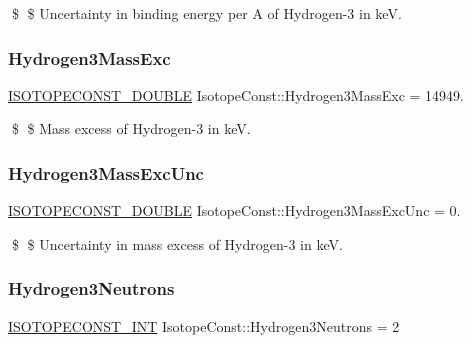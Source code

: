 \$ \$ Uncertainty in binding energy per A of Hydrogen-\/3 in keV. \mbox{\label{group___isotope_const-_hydrogen-_h3_gaa40ef68be116555ca4be81d0c3c4e459}} 
\subsubsection{\texorpdfstring{Hydrogen3\+Mass\+Exc}{Hydrogen3MassExc}}
{\footnotesize\ttfamily \mbox{\hyperlink{group___isotope_const-_macros_ga8f45a7272ce02c0b4c65c44636ed719a}{I\+S\+O\+T\+O\+P\+E\+C\+O\+N\+S\+T\+\_\+\+D\+O\+U\+B\+LE}} Isotope\+Const\+::\+Hydrogen3\+Mass\+Exc = 14949.}

\$ \$ Mass excess of Hydrogen-\/3 in keV. \mbox{\label{group___isotope_const-_hydrogen-_h3_ga9da6defb1f28dce3bb9b5468497a7f9e}} 
\subsubsection{\texorpdfstring{Hydrogen3\+Mass\+Exc\+Unc}{Hydrogen3MassExcUnc}}
{\footnotesize\ttfamily \mbox{\hyperlink{group___isotope_const-_macros_ga8f45a7272ce02c0b4c65c44636ed719a}{I\+S\+O\+T\+O\+P\+E\+C\+O\+N\+S\+T\+\_\+\+D\+O\+U\+B\+LE}} Isotope\+Const\+::\+Hydrogen3\+Mass\+Exc\+Unc = 0.}

\$ \$ Uncertainty in mass excess of Hydrogen-\/3 in keV. \mbox{\label{group___isotope_const-_hydrogen-_h3_ga88d18d6075c341947c82e48fe87c1503}} 
\subsubsection{\texorpdfstring{Hydrogen3\+Neutrons}{Hydrogen3Neutrons}}
{\footnotesize\ttfamily \mbox{\hyperlink{group___isotope_const-_macros_ga5f18360b3e99483a35c32d789e62621c}{I\+S\+O\+T\+O\+P\+E\+C\+O\+N\+S\+T\+\_\+\+I\+NT}} Isotope\+Const\+::\+Hydrogen3\+Neutrons = 2}

